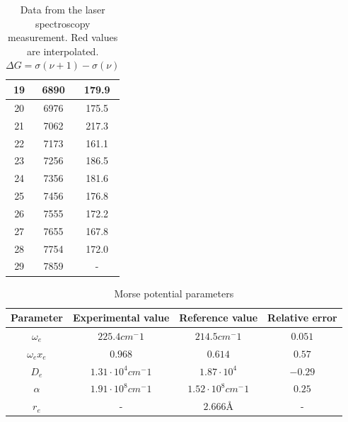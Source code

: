 \documentclass[12pt]{article}
\begin{document}
\begin{table}[ht]
\begin{tabular}{| c | c | c | }
    19  &   6890	&	179.9 \\ \hline
    {\color{red} 20}   &   {\color{red}6976}	&	{\color{red}175.5} \\ \hline
    21  &   7062	&	217.3 \\ \hline
    22  &   7173	&	161.1 \\ \hline
    23  &   7256	&	186.5 \\ \hline
    24  &   7356	&	181.6 \\ \hline
    {\color{red} 25}   &   {\color{red}7456}	&	{\color{red}176.8} \\ \hline
    26  &   7555	&	172.2 \\ \hline
    {\color{red} 27}   &   {\color{red}7655}	&	{\color{red}167.8} \\ \hline
    28  &   7754    &	172.0 \\ \hline
    29  &   7859    &   - \\ \hline
    
\end{tabular}
\caption{Data from the laser spectroscopy measurement. Red values are interpolated. $\Delta G = \sigma(\nu + 1) - \sigma(\nu)$}
\label{table:data}
\end{table}

\begin{table}[ht]
\centering
\begin{tabular}{| c | c | c | c | }
    \hline
    Parameter & Experimental value & Reference value & Relative error \\ \hline
    $\omega_e$ & $225.4 cm^-1$ & $214.5 cm^-1$ & $0.051$ \\ \hline
    $\omega_ex_e$ & $0.968$ & $0.614$ & $0.57$ \\ \hline
    $D_e$ & $1.31\cdot10^4 cm^-1$ &  $1.87 \cdot 10^4$ & $-0.29$ \\ \hline
    $\alpha$ & $1.91\cdot10^8 cm^-1$ & $1.52\cdot10^8 cm^-1$ & $0.25$ \\ \hline
    $r_e$ &  - & $2.666 Å$ & - \\ \hline
\end{tabular}
\caption{Morse potential parameters}
\label{table:values}
\end{table}
\end{document}
